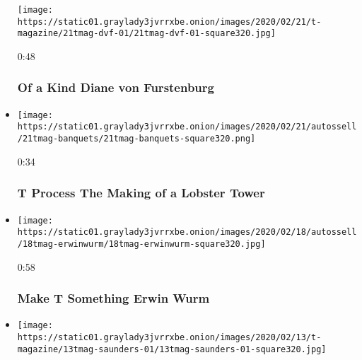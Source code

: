 \begin{itemize}
  \texttt{[image: https://static01.graylady3jvrrxbe.onion/images/2020/02/21/t-magazine/21tmag-dvf-01/21tmag-dvf-01-square320.jpg]}

  0:48

  \hypertarget{of-a-kind--diane-von-furstenburg}{%
  \subsubsection{Of a Kind \textbar{} Diane von
  Furstenburg}\label{of-a-kind--diane-von-furstenburg}}
\item
  \href{https://www.nytimes3xbfgragh.onion/video/t-magazine/100000006981030/t-process-the-making-of-a-lobster-tower.html?action=click\&module=video-series-bar\&region=header\&pgtype=Article\&playlistId=video/t-magazine}{}

  \texttt{[image: https://static01.graylady3jvrrxbe.onion/images/2020/02/21/autossell/21tmag-banquets/21tmag-banquets-square320.png]}

  0:34

  \hypertarget{t-process--the-making-of-a-lobster-tower}{%
  \subsubsection{T Process \textbar{} The Making of a Lobster
  Tower}\label{t-process--the-making-of-a-lobster-tower}}
\item
  \href{https://www.nytimes3xbfgragh.onion/video/t-magazine/100000006981365/make-t-something-erwin-wurm.html?action=click\&module=video-series-bar\&region=header\&pgtype=Article\&playlistId=video/t-magazine}{}

  \texttt{[image: https://static01.graylady3jvrrxbe.onion/images/2020/02/18/autossell/18tmag-erwinwurm/18tmag-erwinwurm-square320.jpg]}

  0:58

  \hypertarget{make-t-something--erwin-wurm}{%
  \subsubsection{Make T Something \textbar{} Erwin
  Wurm}\label{make-t-something--erwin-wurm}}
\item
  \href{https://www.nytimes3xbfgragh.onion/video/t-magazine/design/100000006971957/house-tour-jonathan-saunders.html?action=click\&module=video-series-bar\&region=header\&pgtype=Article\&playlistId=video/t-magazine}{}

  \texttt{[image: https://static01.graylady3jvrrxbe.onion/images/2020/02/13/t-magazine/13tmag-saunders-01/13tmag-saunders-01-square320.jpg]}


\end{itemize}
